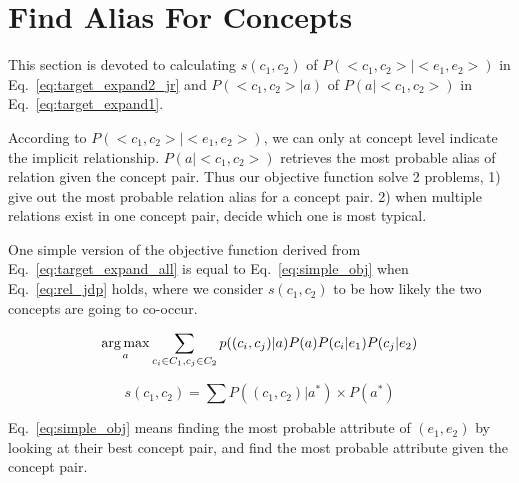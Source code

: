 \section{Find Alias For Concepts}
\label{sec:fafa}





This section is devoted to calculating $s(c_1,c_2)$ of $P(<c_{1},c_{2}>|<e_{1},e_{2}>)$ in Eq.~\ref{eq:target_expand2_jr} and $P(<c_{1},c_{2}>|a)$ of $P(a|<c_{1},c_{2}>)$ in Eq.~\ref{eq:target_expand1}.

According to $P(<c_1,c_2>|<e_1,e_2>)$, we can only at concept level indicate the implicit relationship.
$P(a|<c_{1},c_{2}>)$ retrieves the most probable alias of relation given the concept pair.
Thus our objective function solve 2 problems,
1) give out the most probable relation alias for a concept pair.
2) when multiple relations exist in one concept pair, decide which one is most typical.

One simple version of the objective function derived from Eq.~\ref{eq:target_expand_all} is equal to Eq.~\ref{eq:simple_obj} when Eq.~\ref{eq:rel_jdp} holds, where we consider $s(c_1,c_2)$ to be how likely the two concepts are going to co-occur.

\begin{equation}
\label{eq:simple_obj}
 \operatorname*{arg\,max}_a \sum_{c_i\in C_1, c_j\in C_2} p((c_{i},c_{j})|a) P(a) P(c_i|e_1) P(c_j|e_2)
\end{equation}

\begin{equation}\label{eq:rel_jdp}
  s(c_1,c_2) = \sum{ P((c_{1},c_{2})|a^*) \times P(a^*)}
\end{equation}



Eq.~\ref{eq:simple_obj} means finding the most probable attribute of $(e_1,e_2)$ by looking at their best concept pair, and find the most probable attribute given the concept pair.


